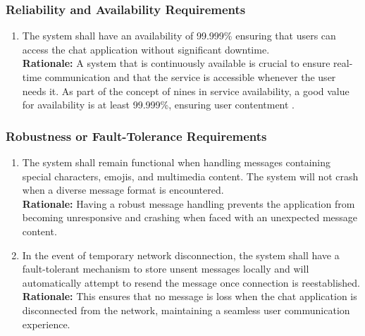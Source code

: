 \documentclass[]{article}
\begin{document}
\subsubsection{Reliability and Availability Requirements}
\label{ssub:reliability_and_availability_requirements}
\begin{enumerate}[{PR-RA}1. ]
	\item The system shall have an availability of 99.999\% ensuring that users can access the chat application without
	      significant downtime. \\
	      {\bf Rationale:} A system that is continuously available is crucial to ensure real-time communication and that the service is accessible whenever
	      the user needs it. As part of the concept of nines in service availability, a good value for availability is at least 99.999\%, ensuring
	      user contentment \cite{6c}.
\end{enumerate}
\subsubsection{Robustness or Fault-Tolerance Requirements}
\label{ssub:robustness_or_fault_tolerance_requirements}
\begin{enumerate}[{PR-RFT}1. ]
	\item The system shall remain functional when handling messages containing special characters, emojis, and
	      multimedia content. The system will not crash when a diverse message format is encountered. \\
	      {\bf Rationale:} Having a robust message handling prevents the application from becoming unresponsive and crashing
	      when faced with an unexpected message content.
	\item In the event of temporary network disconnection, the system shall have a fault-tolerant mechanism to store unsent messages locally and will automatically
	      attempt to resend the message once connection is reestablished. \\
	      {\bf Rationale:} This ensures that no message is loss when the chat application is disconnected from the network, maintaining
	      a seamless user communication experience.
\end{enumerate}
\end{document}
